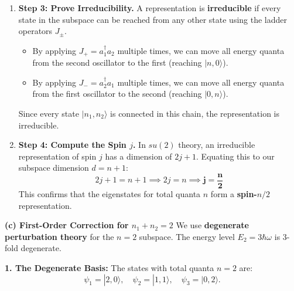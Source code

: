 \begin{solution}
\begin{enumerate}
    \item \textbf{Step 3: Prove Irreducibility.}
    A representation is \textbf{irreducible} if every state in the subspace can be reached from any other state using the ladder operators $J_\pm$. 
    \begin{itemize}
        \item By applying $J_+ = a_1^\dagger a_2$ multiple times, we can move all energy quanta from the second oscillator to the first (reaching $|n, 0\rangle$).
        \item By applying $J_- = a_2^\dagger a_1$ multiple times, we can move all energy quanta from the first oscillator to the second (reaching $|0, n\rangle$).
    \end{itemize}
    Since every state $|n_1, n_2\rangle$ is connected in this chain, the representation is irreducible.

    \item \textbf{Step 4: Compute the Spin $j$.}
    In $su(2)$ theory, an irreducible representation of spin $j$ has a dimension of $2j + 1$. Equating this to our subspace dimension $d = n+1$:
    \[ 2j + 1 = n + 1 \implies 2j = n \implies \mathbf{j = \frac{n}{2}} \]
    This confirms that the eigenstates for total quanta $n$ form a \textbf{spin-$n/2$} representation.
\end{enumerate}
\textbf{(c) First-Order Correction for $n_1 + n_2 = 2$}
We use \textbf{degenerate perturbation theory} for the $n=2$ subspace. The energy level $E_2 = 3\hbar\omega$ is 3-fold degenerate.

\textbf{1. The Degenerate Basis:}
The states with total quanta $n=2$ are:
\[ \psi_1 = |2, 0\rangle, \quad \psi_2 = |1, 1\rangle, \quad \psi_3 = |0, 2\rangle. \]


\end{solution}
